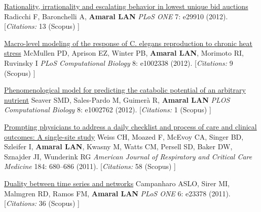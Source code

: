 \NumberedItem{\makebox[0.8cm][r]{[97]}}
\href{/people/amaral/rationality-irrationality-and-escalating-behavior-lowest-unique-bid-auctions}
{Rationality, irrationality and escalating behavior in lowest unique bid auctions}
\newline
Radicchi F, Baronchelli A, {\textbf{Amaral LAN}}
\newline
\textit{PLoS ONE}
    7:
e29910 (2012).
    [{\em{Citations:}}  13 (Scopus) ]
\newline
\Gap
~
\Gap

\NumberedItem{\makebox[0.8cm][r]{[96]}}
\href{/people/amaral/macro-level-modeling-response-_c-elegans_-reproduction-chronic-heat-stress}
{Macro-level modeling of the response of C. elegans reproduction to chronic heat stress}
\newline
McMullen PD, Aprison EZ, Winter PB, {\textbf{Amaral LAN}}, Morimoto RI, Ruvinsky I
\newline
\textit{PLoS Computational Biology}
    8:
e1002338 (2012).
    [{\em{Citations:}}  9 (Scopus) ]
\newline
\Gap
~
\Gap

\NumberedItem{\makebox[0.8cm][r]{[95]}}
\href{/people/amaral/phenomenological-model-predicting-catabolic-potential-arbitrary-nutrient}
{Phenomenological model for predicting the catabolic potential of an arbitrary nutrient}
\newline
Seaver SMD, Sales-Pardo M, Guimer\`a R, {\textbf{Amaral LAN}}
\newline
\textit{PLOS Computational Biology}
    8:
e1002762 (2012).
    [{\em{Citations:}}  1 (Scopus) ]
\newline
\Gap
~
\Gap

\NumberedItem{\makebox[0.8cm][r]{[94]}}
\href{/people/amaral/prompting-physicians-address-daily-checklist-and-process-care-and-clinical-outcomes-single-site-study}
{Prompting physicians to address a daily checklist and process of care and clinical outcomes: A single-site study}
\newline
Weiss CH, Moazed F, McEvoy CA, Singer BD, Szleifer I, {\textbf{Amaral LAN}}, Kwasny M, Watts CM, Persell SD, Baker DW, Sznajder JI, Wunderink RG
\newline
\textit{American Journal of Respiratory and Critical Care Medicine}
    184:
680--686 (2011).
    [{\em{Citations:}}  58 (Scopus) ]
\newline
\Gap
~
\Gap

\NumberedItem{\makebox[0.8cm][r]{[93]}}
\href{/people/amaral/duality-between-time-series-and-networks}
{Duality between time series and networks}
\newline
Campanharo ASLO, Sirer MI, Malmgren RD, Ramos FM, {\textbf{Amaral LAN}}
\newline
\textit{PLoS ONE}
    6:
e23378 (2011).
    [{\em{Citations:}}  36 (Scopus) ]
\newline
\Gap
~
\Gap

